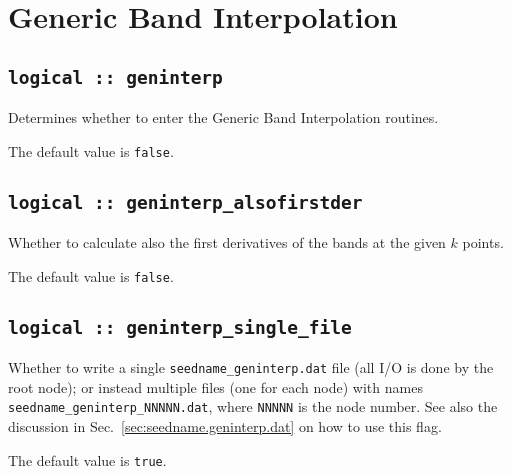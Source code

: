 %
%

%


\section{Generic Band Interpolation}
\subsection[boltzwann]{\tt logical :: geninterp}
Determines whether to enter the Generic Band Interpolation routines.

The default value is \verb#false#.

\subsection[geninterp\_alsofirstder]{\tt logical :: geninterp\_alsofirstder}
Whether to calculate also the first derivatives of the bands at the
given $k$ points.

The default value is \verb#false#.

\subsection[geninterp\_alsofirstder]{\tt logical :: geninterp\_single\_file}
Whether to write a single  {\tt seedname\_geninterp.dat} file (all I/O is done by the root node); or
instead multiple files (one for each node) with
names {\tt seedname\_geninterp\_NNNNN.dat}, where {\tt NNNNN} is the
node number.
See also the discussion in Sec.~\ref{sec:seedname.geninterp.dat} on
how to use this flag.

The default value is \verb#true#.
